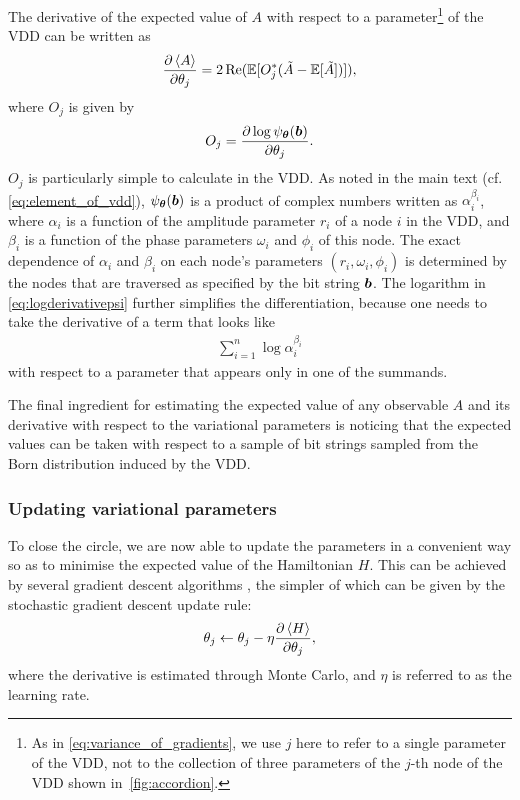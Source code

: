 \documentclass{ieeeaccess}
\begin{document}
The derivative of the expected value of $A$ with respect to a parameter\footnote{As in \cref{eq:variance_of_gradients}, we use $j$ here to refer to a single parameter of the VDD, not to the collection of three parameters of the $j$-th node of the VDD shown in~\cref{fig:accordion}.} of the VDD can be written as~\cite{netket3}
\begin{align}
    \pdv{\expval{A}}{\theta_j} = 2\Re(\mathbb{E}[O_j^*(\tilde{A} - \mathbb{E}[\tilde{A}])]),
\end{align}
where $O_j$ is given by
\begin{align}
    O_j=\pdv{\log\psi_{\vb*{\theta}}(\vb*{b})}{\theta_j}.\label{eq:logderivativepsi}
\end{align}
$O_j$ is particularly simple to calculate in the VDD.
As noted in the main text (cf.\cref{eq:element_of_vdd}), $\psi_{\vb*{\theta}}(\vb*{b})$ is a product of complex numbers written as $\alpha_i^{\beta_i}$, where $\alpha_i$ is a function of the amplitude parameter $r_i$ of a node $i$ in the VDD, and $\beta_i$ is a function of the phase parameters $\omega_i$ and $\phi_i$ of this node.
The exact dependence of $\alpha_i$ and $\beta_i$ on each node's parameters $(r_i,\omega_i,\phi_i)$ is determined by the nodes that are traversed as specified by the bit string $\vb*{b}$.
The logarithm in \cref{eq:logderivativepsi} further simplifies the differentiation, because one needs to take the derivative of a term that looks like
\begin{align}
    \sum_{i=1}^n \log \alpha_i^{\beta_i}
\end{align}
with respect to a parameter that appears only in one of the summands.

The final ingredient for estimating the expected value of any observable $A$ and its derivative with respect to the variational parameters is noticing that the expected values can be taken with respect to a sample of bit strings sampled from the Born distribution induced by the VDD.

\subsubsection{Updating variational parameters}

To close the circle, we are now able to update the parameters in a convenient way so as to minimise the expected value of the Hamiltonian $H$.
This can be achieved by several gradient descent algorithms \cite{sun2020optimization}, the simpler of which can be given by the stochastic gradient descent update rule:
\begin{align}
    \theta_j \leftarrow \theta_j - \eta \pdv{\expval{H}}{\theta_j},
\end{align}
where the derivative is estimated through Monte Carlo, and $\eta$ is referred to as the learning rate.
\end{document}
